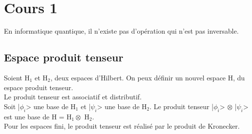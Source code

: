 \section{Cours 1}
En informatique quantique, il n'existe pas d'opération qui n'est pas inversable.

\subsection{Espace produit tenseur}
Soient H$_1$ et H$_2$, deux espaces d'Hilbert. On peux définir un nouvel espace H, du espace produit tenseur.\\
Le produit tenseur est associatif et distributif.\\
Soit |$\phi_i$> une base de H$_1$ et |$\psi_i$> une base de H$_2$. Le produit tenseur |$\phi_i$> $\otimes$ |$\psi_i$> 
est une base de H = H$_1\otimes$ H$_2$.\\
Pour les espaces fini, le produit tenseur est réalisé par le produit de Kronecker.
